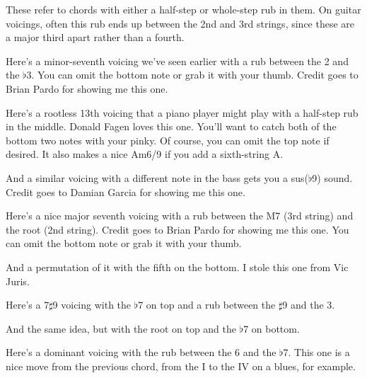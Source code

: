 
These refer to chords with either a half-step or whole-step rub in them.  On guitar voicings, often this rub ends up between the 2nd and 3rd strings, since these are a major third apart rather than a fourth.

\def\numfrets{6}

Here's a minor-seventh voicing we've seen earlier with a rub between the 2 and the $\flat$3.  You can omit the bottom note or grab it with your thumb.  Credit goes to Brian Pardo for showing me this one.


Here's a rootless 13th voicing that a piano player might play with a half-step rub in the middle.  Donald Fagen loves this one.  You'll want to catch both of the bottom two notes with your pinky.  Of course, you can omit the top note if desired.  It also makes a nice Am6/9 if you add a sixth-string A.


And a similar voicing with a different note in the bass gets you a sus($\flat$9) sound.  Credit goes to Damian Garcia for showing me this one.

Here's a nice major seventh voicing with a rub between the M7 (3rd string) and the root (2nd string).  Credit goes to Brian Pardo for showing me this one.  You can omit the bottom note or grab it with your thumb.


And a permutation of it with the fifth on the bottom.  I stole this one from Vic Juris.


Here's a 7$\sharp$9 voicing with the $\flat$7 on top and a rub between the $\sharp$9 and the 3.


And the same idea, but with the root on top and the $\flat$7 on bottom.


Here's a dominant voicing with the rub between the 6 and the $\flat$7.  This one is a nice move from the previous chord, from the I to the IV on a blues, for example.

